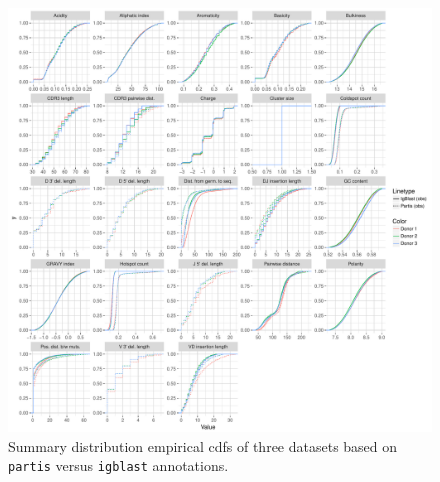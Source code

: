 \documentclass{article}
\begin{document}
\begin{figure}
    \includegraphics[width=\linewidth]{Figures/PartisScores/pi_ecdf.pdf}
    \caption{Summary distribution empirical cdfs of three datasets based on \texttt{partis} versus \texttt{igblast} annotations.}
\end{figure}
\end{document}
